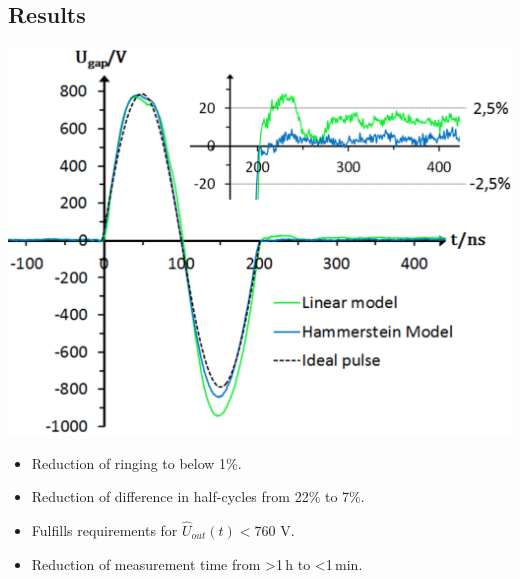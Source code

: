 \documentclass[paper=a0,accentcolor=tud9b,colorbacktitle,colorbacksubtitle]{tudposter}
\begin{document}
\begin{multicols}{2}
	\section{Results}
	\begin{center}
	 \includegraphics[scale=1.2]{WEPVA047f7.eps}
	 \label{Vergleich}
	 \end{center}	 
	\begin{minipage}{0.24\textwidth}
	 \begin{itemize}
	 \item Reduction of ringing to below 1\%.
	 \item Reduction of difference in half-cycles from 22\% to 7\%.
	 \end{itemize}
	\end{minipage}
	\begin{minipage}{0.25\textwidth}
	 \begin{itemize}
	 \item Fulfills requirements for $\textstyle \hat{U}_{out}(t)<760$ V.
	 \item Reduction of measurement time from >1\,h to <1\,min.
	 \end{itemize}
	\end{minipage}




\end{multicols}
\end{document}
